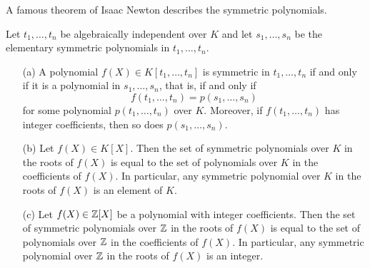 A famous theorem of Isaac Newton describes the symmetric polynomials.
\begin{theorem}\label{Newton's Theorem}
Let $t_1,\dots,t_n$ be algebraically independent over $K$ and let $s_1,\dots,s_n$ be the elementary symmetric polynomials in $t_1,\dots,t_n$.
\begin{itemize}
\item[(a)] A polynomial $f(X)\in K[t_1,\dots,t_n]$ is symmetric in $t_1,\dots,t_n$ if and only if it is a polynomial in $s_1,\dots,s_n$, that is, if and only if
\[f(t_1,\dots,t_n)=p(s_1,\dots,s_n)\]
for some polynomial $p(t_1,\dots,t_n)$ over $K$. Moreover, if $f(t_1,\dots,t_n)$ has integer coefficients, then so does $p(s_1,\dots,s_n)$.
\item[(b)] Let $f(X)\in K[X]$. Then the set of symmetric polynomials over $K$ in the roots of $f(X)$ is equal to the set of polynomials over $K$ in the coefficients of $f(X)$. In particular, any symmetric polynomial over $K$ in the roots of $f(X)$ is an element of $K$.
\item[(c)] Let $f(X)\in\mathbb{Z}[X]$ be a polynomial with integer coefficients. Then the set of symmetric polynomials over $\mathbb{Z}$ in the roots of $f(X)$ is equal to the set of polynomials over $\mathbb{Z}$ in the coefficients of $f(X)$. In particular, any symmetric polynomial over $\mathbb{Z}$ in the roots of $f(X)$ is an integer.
\end{itemize}
\end{theorem}
